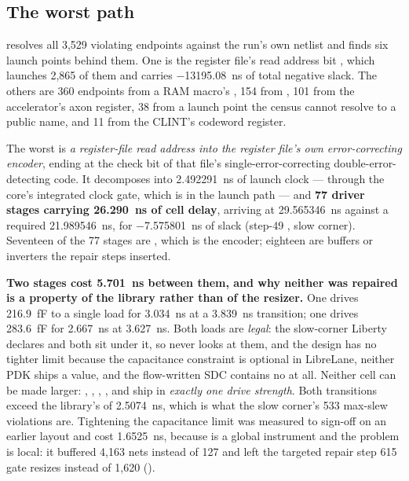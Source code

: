 \subsection{The worst path}

 resolves all 3,529
violating endpoints against the run's own netlist and finds six launch
points behind them. One is the register file's read address bit
, which launches 2,865 of them and carries
\qty{-13195.08}{\nano\second} of total negative slack. The others are
360 endpoints from a RAM macro's , 154 from
, 101 from the accelerator's axon register, 38 from
a launch point the census cannot resolve to a public name, and 11 from
the CLINT's  codeword register.

The worst is \emph{a register-file read address into the register file's
own error-correcting encoder}, ending at the check bit
 of that file's
single-error-correcting double-error-detecting code. It decomposes
into \qty{2.492291}{\nano\second} of launch clock --- through the core's
integrated clock gate, which is in the launch path --- and \textbf{77
driver stages carrying \qty{26.290}{\nano\second} of cell delay},
arriving at \qty{29.565346}{\nano\second} against a required
\qty{21.989546}{\nano\second}, for \qty{-7.575801}{\nano\second} of
slack (step-49 , slow corner). Seventeen of the 77 stages
are , which is the encoder; eighteen are buffers
or inverters the repair steps inserted.

\textbf{Two stages cost \qty{5.701}{\nano\second} between them, and why
neither was repaired is a property of the library rather than of the
resizer.} One  drives \qty{216.9}{\femto\farad}
to a single load for \qty{3.034}{\nano\second} at a
\qty{3.839}{\nano\second} transition; one  drives
\qty{283.6}{\femto\farad} for \qty{2.667}{\nano\second} at
\qty{3.627}{\nano\second}. Both loads are \emph{legal}: the slow-corner
Liberty declares  and
both sit under it, so  never looks at them, and the
design has no tighter limit because the capacitance constraint is
optional in LibreLane, neither PDK ships a value, and the flow-written
SDC contains no  at all. Neither cell can be
made larger: , , , ,
 and  ship in \emph{exactly one drive
strength}. Both transitions exceed the library's
 of
\qty{2.5074}{\nano\second}, which is what the slow corner's 533 max-slew
violations are. Tightening the capacitance limit was measured to
sign-off on an earlier layout and cost \qty{1.6525}{\nano\second},
because  is a global instrument and the problem is
local: it buffered 4,163 nets instead of 127 and left the targeted
repair step 615 gate resizes instead of 1,620
().

